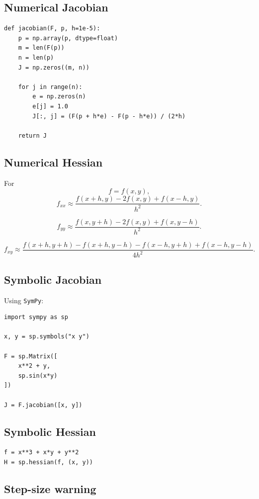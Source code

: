 \subsection*{Numerical Jacobian}

\begin{verbatim}
def jacobian(F, p, h=1e-5):
    p = np.array(p, dtype=float)
    m = len(F(p))
    n = len(p)
    J = np.zeros((m, n))

    for j in range(n):
        e = np.zeros(n)
        e[j] = 1.0
        J[:, j] = (F(p + h*e) - F(p - h*e)) / (2*h)

    return J
\end{verbatim}

\subsection*{Numerical Hessian}

For
\[
    f=f(x,y),
\]
\[
\boxed{
    f_{xx}\approx
    \frac{f(x+h,y)-2f(x,y)+f(x-h,y)}{h^2}.
}
\]

\[
\boxed{
    f_{yy}\approx
    \frac{f(x,y+h)-2f(x,y)+f(x,y-h)}{h^2}.
}
\]

\[
\boxed{
    f_{xy}\approx
    \frac{
    f(x+h,y+h)-f(x+h,y-h)-f(x-h,y+h)+f(x-h,y-h)
    }{4h^2}.
}
\]

\subsection*{Symbolic Jacobian}

Using \texttt{SymPy}:

\begin{verbatim}
import sympy as sp

x, y = sp.symbols("x y")

F = sp.Matrix([
    x**2 + y,
    sp.sin(x*y)
])

J = F.jacobian([x, y])
\end{verbatim}

\subsection*{Symbolic Hessian}

\begin{verbatim}
f = x**3 + x*y + y**2
H = sp.hessian(f, (x, y))
\end{verbatim}

\subsection*{Step-size warning}

